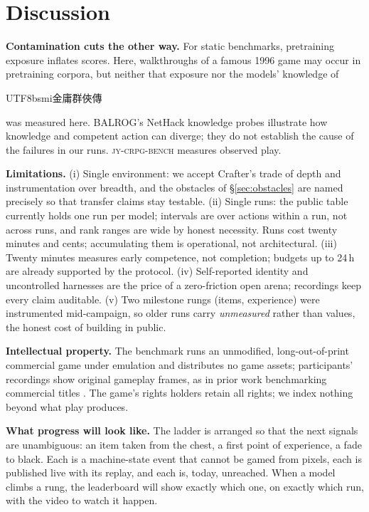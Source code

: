 \documentclass{article} %
\newcommand{\bench}{\textsc{jy-crpg-bench}}
\newcommand{\game}[1]{\begin{CJK}{UTF8}{bsmi}#1\end{CJK}}
\begin{document}
\section{Discussion}
\label{sec:discussion}

\textbf{Contamination cuts the other way.} For static benchmarks,
pretraining exposure inflates scores. Here, walkthroughs of a famous 1996
game may occur in pretraining corpora, but neither that exposure nor the
models' knowledge of \game{金庸群俠傳} was measured here.
BALROG's NetHack knowledge probes \citep{paglieri2025balrog} illustrate how
knowledge and competent action can diverge; they do not establish the
cause of the failures in our runs. \bench{} measures observed play.

\textbf{Limitations.} (i) Single environment: we accept Crafter's trade \citep{hafner2021benchmarking} of depth and
instrumentation over breadth, and the
obstacles of \S\ref{sec:obstacles} are named precisely so that transfer
claims stay testable. (ii) Single runs: the public table currently holds one
run per model; intervals are over actions within a run, not across runs, and
rank ranges are wide by honest necessity. Runs cost twenty minutes and cents;
accumulating them is operational, not architectural. (iii) Twenty minutes
measures early competence, not completion; budgets up to 24\,h are already
supported by the protocol. (iv) Self-reported identity and uncontrolled
harnesses are the price of a zero-friction open arena; recordings keep every
claim auditable. (v) Two milestone rungs (items, experience) were
instrumented mid-campaign, so older runs carry \emph{unmeasured} rather than values, the honest cost of building
in public.

\textbf{Intellectual property.} The benchmark runs an unmodified,
long-out-of-print commercial game under emulation and distributes no game
assets; participants' recordings show original gameplay frames, as in prior
work benchmarking commercial titles \citep{zhang2025videogamebench,
bellemare2013arcade}. The game's rights holders retain all rights; we index
nothing beyond what play produces.

\textbf{What progress will look like.} The ladder is arranged so that the
next signals are unambiguous: an item taken from the chest, a first point of
experience, a fade to black. Each is a machine-state event that cannot be
gamed from pixels, each is published live with its replay, and each is, today, unreached. When a model climbs a rung, the leaderboard will show
exactly which one, on exactly which run, with the video to watch it happen.
\end{document}
